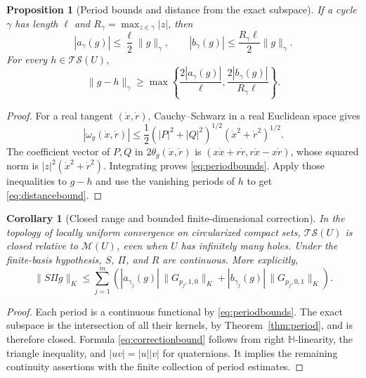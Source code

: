 \documentclass[11pt,a4paper]{article}
\numberwithin{equation}{section}
\newtheorem{proposition}[theorem]{Proposition}
\newtheorem{corollary}[theorem]{Corollary}
\theoremstyle{definition}
\theoremstyle{remark}
\newcommand{\HH}{\mathbb H}
\newcommand{\cS}{\mathscr S}
\newcommand{\cM}{\mathscr M}
\newcommand{\T}{\mathcal T}
\newcommand{\norm}[1]{\lVert#1\rVert}
\begin{document}
\begin{proposition}[Period bounds and distance from the exact subspace]
\label{prop:bounds}
If a cycle $\gamma$ has length $\ell$ and
$R_\gamma=\max_{z\in\gamma}|z|$, then
\begin{equation}
 |a_\gamma(g)|\le\frac{\ell}{2}\norm{g}_\gamma,
 \qquad
 |b_\gamma(g)|\le\frac{R_\gamma\ell}{2}\norm{g}_\gamma.
 \label{eq:periodbounds}
\end{equation}
For every $h\in\T\cS(U)$,
\begin{equation}
 \norm{g-h}_\gamma\ge
 \max\left\{\frac{2|a_\gamma(g)|}{\ell},
             \frac{2|b_\gamma(g)|}{R_\gamma\ell}\right\}.
 \label{eq:distancebound}
\end{equation}
\end{proposition}
\begin{proof}
For a real tangent $(\dot x,\dot r)$, Cauchy--Schwarz in a real Euclidean
space gives
\[
 |\omega_g(\dot x,\dot r)|
 \le\frac12(|P|^2+|Q|^2)^{1/2}
                    (\dot x^2+\dot r^2)^{1/2}.
\]
The coefficient vector of $P,Q$ in $2\theta_g(\dot x,\dot r)$ is
$(x\dot x+r\dot r,r\dot x-x\dot r)$, whose squared norm is
$|z|^2(\dot x^2+\dot r^2)$. Integrating proves
\eqref{eq:periodbounds}. Apply those inequalities to $g-h$ and use the
vanishing periods of $h$ to get \eqref{eq:distancebound}.
\end{proof}

\begin{corollary}[Closed range and bounded finite-dimensional correction]
\label{cor:closedrange}
In the topology of locally uniform convergence on circularized compact sets,
$\T\cS(U)$ is closed relative to $\cM(U)$, even when $U$ has infinitely
many holes. Under the finite-basis hypothesis, $S$, $\Pi$, and $R$ are
continuous. More explicitly,
\begin{equation}
 \norm{S\Pi g}_K\le\sum_{j=1}^m
 \left(|a_{\gamma_j}(g)|\,\norm{G_{p_j,1,0}}_K
      +|b_{\gamma_j}(g)|\,\norm{G_{p_j,0,1}}_K\right).
 \label{eq:correctionbound}
\end{equation}
\end{corollary}
\begin{proof}
Each period is a continuous functional by \eqref{eq:periodbounds}.
The exact subspace is the intersection of all their kernels, by
Theorem~\ref{thm:period}, and is therefore closed. Formula
\eqref{eq:correctionbound} follows from right $\HH$-linearity, the triangle
inequality, and $|uv|=|u||v|$ for quaternions. It implies the remaining
continuity assertions with the finite collection of period estimates.
\end{proof}
\end{document}
